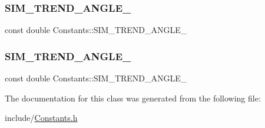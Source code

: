 \subsubsection{\texorpdfstring{S\+I\+M\+\_\+\+T\+R\+E\+N\+D\+\_\+\+A\+N\+G\+L\+E\+\_}{SIM\_TREND\_ANGLE\_1}}
{\footnotesize\ttfamily const double Constants\+::\+S\+I\+M\+\_\+\+T\+R\+E\+N\+D\+\_\+\+A\+N\+G\+L\+E\+\_\hspace{0.3cm}{\ttfamily [static]}}

\mbox{\label{class_constants_a1ec9cdffb9c58a2ff1cb60f64b056835}} 
\subsubsection{\texorpdfstring{S\+I\+M\+\_\+\+T\+R\+E\+N\+D\+\_\+\+A\+N\+G\+L\+E\+\_}{SIM\_TREND\_ANGLE\_2}}
{\footnotesize\ttfamily const double Constants\+::\+S\+I\+M\+\_\+\+T\+R\+E\+N\+D\+\_\+\+A\+N\+G\+L\+E\+\_\hspace{0.3cm}{\ttfamily [static]}}



The documentation for this class was generated from the following file\+:\begin{DoxyCompactItemize}
\item 
include/\hyperlink{_constants_8h}{Constants.\+h}\end{DoxyCompactItemize}
